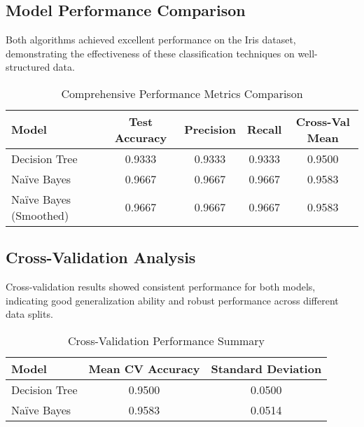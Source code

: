 \documentclass[12pt,a4paper]{article}
\newcommand{\tablealtrow}{\rowcolor{tablealt1}}
\begin{document}
\subsection{Model Performance Comparison}

Both algorithms achieved excellent performance on the Iris dataset, demonstrating the effectiveness of these classification techniques on well-structured data.

\begin{table}[h!]
\centering
\renewcommand{\arraystretch}{1.4}
\begin{tabular}{|l|c|c|c|c|}
\hline
\rowcolor{tableheader}\textcolor{headertext}{\textbf{Model}} & \textcolor{headertext}{\textbf{Test Accuracy}} & \textcolor{headertext}{\textbf{Precision}} & \textcolor{headertext}{\textbf{Recall}} & \textcolor{headertext}{\textbf{Cross-Val Mean}} \\
\hline
\tablealtrow Decision Tree & 0.9333 & 0.9333 & 0.9333 & 0.9500 \\
\rowcolor{tablealt2} Na\"{i}ve Bayes & 0.9667 & 0.9667 & 0.9667 & 0.9583 \\
\tablealtrow Na\"{i}ve Bayes (Smoothed) & 0.9667 & 0.9667 & 0.9667 & 0.9583 \\
\hline
\end{tabular}
\caption{Comprehensive Performance Metrics Comparison}
\end{table}

\subsection{Cross-Validation Analysis}

Cross-validation results showed consistent performance for both models, indicating good generalization ability and robust performance across different data splits.

\begin{table}[h!]
\centering
\renewcommand{\arraystretch}{1.3}
\begin{tabular}{|l|c|c|}
\hline
\rowcolor{tableheader}\textcolor{headertext}{\textbf{Model}} & \textcolor{headertext}{\textbf{Mean CV Accuracy}} & \textcolor{headertext}{\textbf{Standard Deviation}} \\
\hline
\tablealtrow Decision Tree & 0.9500 & 0.0500 \\
\rowcolor{tablealt2} Na\"{i}ve Bayes & 0.9583 & 0.0514 \\
\hline
\end{tabular}
\caption{Cross-Validation Performance Summary}
\end{table}
\end{document}
